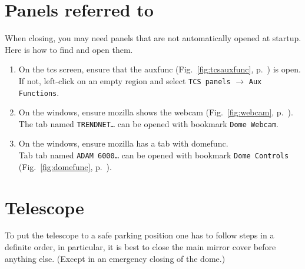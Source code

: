 \documentclass[11pt,fleqn]{book}
\def\figref#1{Fig.~\ref{fig:#1}, p.~\pageref{fig:#1}}
\begin{document}
\section{Panels referred to}
When closing, you may need panels that are not automatically opened at startup. Here is how to find and open them.
\begin{enumerate}
\item On the \gls{tcs} screen, ensure that the \gls{auxfunc} (\figref{tcsauxfunc}) is open.\\
      If not, left-click on an empty region and select \texttt{TCS panels} $\rightarrow$ \texttt{Aux Functions}.
\item On the \gls{windows}, ensure mozilla shows the \gls{webcam} (\figref{webcam}).\\
      The tab named \texttt{TRENDNET…} can be opened with bookmark \texttt{Dome Webcam}.
\item On the \gls{windows}, ensure mozilla has a tab with \gls{domefunc}.\\
      Tab tab named \texttt{ADAM 6000…} can be opened with bookmark \texttt{Dome Controls} (\figref{domefunc}).
\end{enumerate}

\section{Telescope}

To put the telescope to a safe parking position one has to follow steps in a definite order, in particular, it is best to close the main mirror cover before anything else. (Except in an emergency closing of the dome.) 
\end{document}
